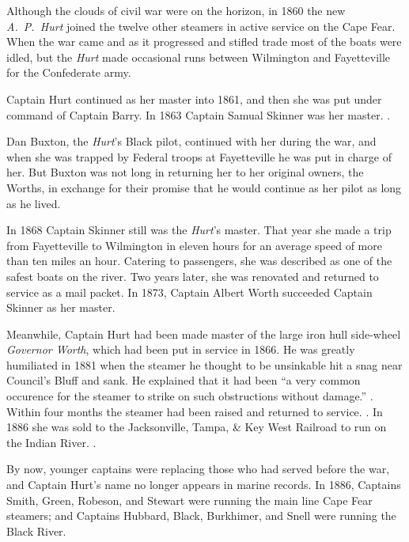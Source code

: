 \documentclass[11pt, a5paper, openright]{book}
\newcommand{\steamer}[1]{\textit{#1}\index{#1,~steamer}}
\begin{document}
Although the clouds of civil war were on the horizon, in 1860 the new
\steamer{A.~P.~Hurt} joined the twelve other steamers in active
service on the Cape Fear.  When the war came and as it progressed and
stifled trade most of the boats were idled, but the \textit{Hurt} made
occasional runs between Wilmington and Fayetteville for the
Confederate army.\par

Captain Hurt continued as her master into
1861, and then she was put under command of Captain Barry.
In 1863 Captain Samual Skinner
was her master.  \citep[2-1863]{wj}.\par

Dan Buxton, the \textit{Hurt}'s Black
pilot, continued with her during the war, and when she was trapped by
Federal troops at Fayetteville he was put in charge of her.  But
Buxton was not long in returning her to her original owners, the
Worths, in exchange for their promise that he would continue as her
pilot as long as he lived.\par

In 1868 Captain Skinner still was the
\textit{Hurt}'s master.  That year she made
a trip from Fayetteville to Wilmington in eleven hours for an average
speed of more than ten miles an hour.  Catering to passengers, she was
described as one of the safest boats on the river.  Two years later,
she was renovated and returned to service as a mail packet.  In 1873,
Captain Albert Worth succeeded Captain
Skinner as her master.\par

Meanwhile, Captain Hurt had been made master
of the large iron hull side-wheel \steamer{Governor Worth}, which had
been put in service in 1866.  He was greatly humiliated in 1881 when
the steamer he thought to be unsinkable hit a snag near Council's
Bluff and sank.  He explained that it had been ``a very common
occurence for the steamer to strike on such obstructions without
damage.''  \citep[1-14-1881]{ws}.  Within four months the steamer had
been raised and returned to service.  \citep[4-15-1881]{ws}.  In 1886
she was sold to the Jacksonville, Tampa, \& Key West Railroad to run
on the Indian River.  \citep[4-23-1886]{ws}.\par

By now, younger captains were replacing those who had served before
the war, and Captain Hurt's name no longer
appears in marine records.  In 1886, Captains Smith,
Green, Robeson, and
Stewart were running the main line Cape Fear
steamers; and Captains Hubbard,
Black, Burkhimer,
and Snell were running the Black River.\par
\end{document}

